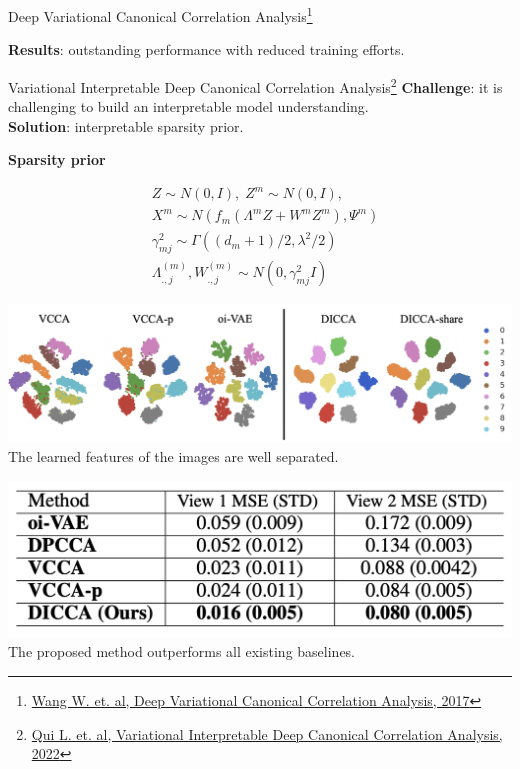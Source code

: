 \documentclass[aspectratio=169]{beamer}
\begin{document}
\begin{frame}{Deep Variational Canonical Correlation Analysis\footnote{\href{https://arxiv.org/pdf/1610.03454.pdf}{Wang W. et. al, Deep Variational Canonical Correlation Analysis, 2017}}}
\begin{minipage}{0.33\textwidth}
    \end{minipage}
    \textbf{Results}: outstanding performance with reduced training efforts.
    
\end{frame}


\begin{frame}{Variational Interpretable Deep Canonical Correlation Analysis\footnote{\href{https://openreview.net/pdf?id=Gzare7_sTAJ}{Qui L. et. al, Variational Interpretable Deep Canonical Correlation Analysis, 2022}}}
    \textbf{Challenge}: it is challenging to build an interpretable model understanding. \\
    \textbf{Solution}: interpretable sparsity prior.\\
    \begin{minipage}{0.33\textwidth}
        \textbf{Sparsity prior}
        \begin{small}
        \begin{align*}
            &Z \sim N(0, I), \; Z^m \sim N(0, I), \\
            &X^m \sim N(f_m(\Lambda^m Z + W^mZ^m), \Psi^m) \\
            &\gamma^2_{mj} \sim \Gamma((d_m + 1)/2, \lambda^2 / 2) \\
            &\Lambda^{(m)}_{., j}, W^{(m)}_{., j} \sim N(0, \gamma^2_{mj}I)
        \end{align*}
        \end{small}
    \end{minipage}\hfill
    \begin{minipage}{0.33\textwidth}
        \includegraphics[width=1.0\textwidth]{figures/fig3.png}
        The learned features of the images are well separated.
    \end{minipage} \hfill
    \begin{minipage}{0.33\textwidth}
        \includegraphics[width=\textwidth]{figures/fig4.png}
        The proposed method outperforms all existing baselines.
    \end{minipage}
\end{frame}
\end{document}
